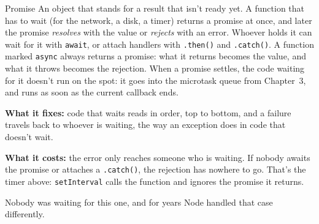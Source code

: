 \begin{concept}{Promise}
An object that stands for a result that isn't ready yet. A function that has to
wait (for the network, a disk, a timer) returns a promise at once, and later the
promise \emph{resolves} with the value or \emph{rejects} with an error. Whoever
holds it can wait for it with \texttt{await}, or attach handlers with
\texttt{.then()} and \texttt{.catch()}. A function marked \texttt{async} always
returns a promise: what it returns becomes the value, and what it throws becomes
the rejection. When a promise settles, the code waiting for it doesn't run on
the spot: it goes into the microtask queue from Chapter~3, and runs as soon as
the current callback ends.

\textbf{What it fixes:} code that waits reads in order, top to bottom, and a
failure travels back to whoever is waiting, the way an exception does in code
that doesn't wait.

\textbf{What it costs:} the error only reaches someone who is waiting. If nobody
awaits the promise or attaches a \texttt{.catch()}, the rejection has nowhere to
go. That's the timer above: \texttt{setInterval} calls the function and ignores
the promise it returns.
\end{concept}

Nobody was waiting for this one, and for years Node handled that case
differently.

